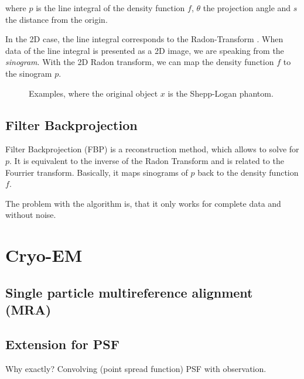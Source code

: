 where $p$ is the line integral of the density function $f$, $\theta$ the projection angle and $s$ the distance from the origin.

In the 2D case, the line integral corresponds to the Radon-Transform \cite{radonTransform}.
When data of the line integral is presented as a 2D image, we are speaking from the \textit{sinogram}.
With the 2D Radon transform, we can map the density function $f$ to the sinogram $p$. 

\begin{figure}
    \centering
    \caption{Examples, where the original object $x$ is the Shepp-Logan phantom.}
    \label{fig:phantom}
\end{figure}

\subsection{Filter Backprojection}
Filter Backprojection (FBP) is a reconstruction method, which allows to solve for $p$. It is equivalent to the inverse of the Radon Transform
and is related to the Fourrier transform. Basically, it maps sinograms of $p$ back to the density function $f$.

The problem with the algorithm is, that it only works for complete data and without noise.



\section{Cryo-EM}


\subsection{Single particle multireference alignment (MRA)}


\subsection{Extension for PSF}

Why exactly?
Convolving (point spread function) PSF  with observation.


